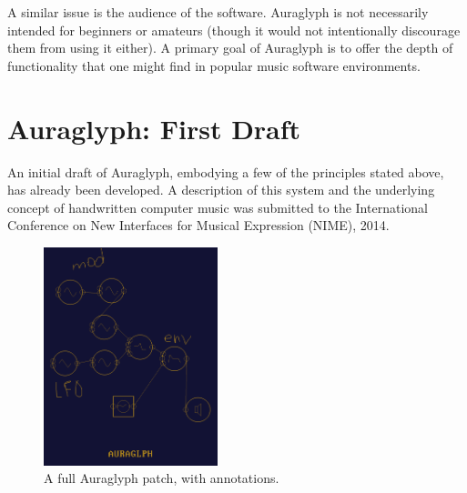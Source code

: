 \documentclass[10pt,letterpaper]{article}
\begin{document}
A similar issue is the audience of the software. 
Auraglyph is not necessarily intended for beginners or amateurs (though it would not intentionally discourage them from using it either). 
A primary goal of Auraglyph is to offer the depth of functionality that one might find in popular music software environments. 


\section{Auraglyph: First Draft}
\label{sec:SystemDescription}

An initial draft of Auraglyph, embodying a few of the principles stated above, has already been developed. 
A description of this system and the underlying concept of handwritten computer music was submitted to the International Conference on New Interfaces for Musical Expression (NIME), 2014. 


\begin{figure}[h]
	\centering
		\includegraphics[width=0.45\textwidth]{figures/patch.png}
	\caption{A full Auraglyph patch, with annotations.}
	\label{fig:patch}
\end{figure}
\end{document}
